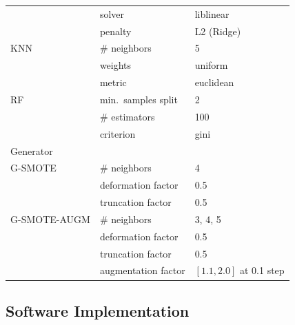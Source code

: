 \begin{table}
\begin{tabular}{lll}
		                & solver                           & liblinear                      \\
                        & penalty                          & L2 (Ridge)                     \\
		KNN             & \# neighbors                     & 5                              \\
                        & weights                          & uniform                        \\
                        & metric                           & euclidean                      \\
		RF              & min.\ samples split              & 2                              \\
		                & \# estimators                    & 100                            \\
                        & criterion                        & gini                           \\
		\toprule
		Generator       &                                  &                                \\
		\midrule
		G-SMOTE         & \# neighbors                     & 4                              \\
                        & deformation factor               & 0.5                            \\
                        & truncation factor                & 0.5                            \\
		G-SMOTE-AUGM    & \# neighbors                     & 3, 4, 5                        \\
                        & deformation factor               & 0.5                            \\
                        & truncation factor                & 0.5                            \\
                        & augmentation factor              & $[1.1, 2.0]$ at 0.1 step       \\
		\bottomrule
	\end{tabular}
\end{table}
 
\subsection{Software Implementation}~\label{sec:software_implementation}

